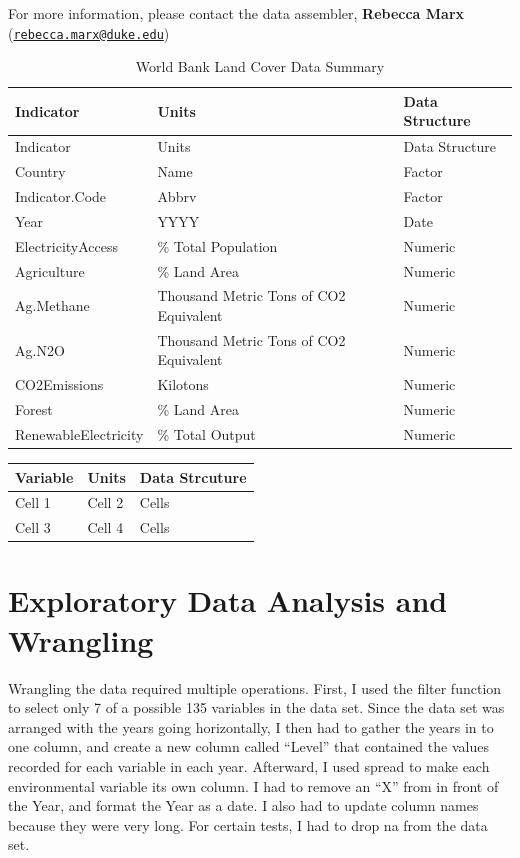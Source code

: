 \documentclass[12pt,]{article}
\begin{document}
For more information, please contact the data assembler, \textbf{Rebecca
Marx}
(\href{mailto:rebecca.marx@duke.edu}{\nolinkurl{rebecca.marx@duke.edu}})

\begin{longtable}[]{@{}lll@{}}
\caption{\label{tab:table} World Bank Land Cover Data
Summary}\tabularnewline
\toprule
Indicator & Units & Data Structure\tabularnewline
\midrule
\endfirsthead
\toprule
Indicator & Units & Data Structure\tabularnewline
\midrule
\endhead
Country & Name & Factor\tabularnewline
Indicator.Code & Abbrv & Factor\tabularnewline
Year & YYYY & Date\tabularnewline
ElectricityAccess & \% Total Population & Numeric\tabularnewline
Agriculture & \% Land Area & Numeric\tabularnewline
Ag.Methane & Thousand Metric Tons of CO2 Equivalent &
Numeric\tabularnewline
Ag.N2O & Thousand Metric Tons of CO2 Equivalent & Numeric\tabularnewline
CO2Emissions & Kilotons & Numeric\tabularnewline
Forest & \% Land Area & Numeric\tabularnewline
RenewableElectricity & \% Total Output & Numeric\tabularnewline
\bottomrule
\end{longtable}

\begin{longtable}[]{@{}lll@{}}
\toprule
Variable & Units & Data Strcuture\tabularnewline
\midrule
\endhead
Cell 1 & Cell 2 & Cells\tabularnewline
Cell 3 & Cell 4 & Cells\tabularnewline
\bottomrule
\end{longtable}

\newpage

\section{Exploratory Data Analysis and
Wrangling}\label{exploratory-data-analysis-and-wrangling}

Wrangling the data required multiple operations. First, I used the
filter function to select only 7 of a possible 135 variables in the data
set. Since the data set was arranged with the years going horizontally,
I then had to gather the years in to one column, and create a new column
called ``Level'' that contained the values recorded for each variable in
each year. Afterward, I used spread to make each environmental variable
its own column. I had to remove an ``X'' from in front of the Year, and
format the Year as a date. I also had to update column names because
they were very long. For certain tests, I had to drop na from the data
set.
\end{document}
